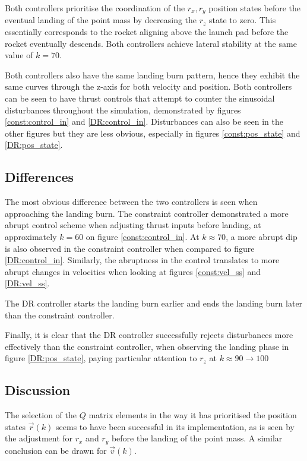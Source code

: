 \documentclass[conference, tikz]{IEEEtran}
\begin{document}
Both controllers prioritise the coordination of the $r_x, r_y$ position states before the eventual landing of the point mass by decreasing the $r_z$ state to zero. This essentially corresponds to the rocket aligning above the launch pad before the rocket eventually descends. Both controllers achieve lateral stability at the same value of $k=70$. 

Both controllers also have the same landing burn pattern, hence they exhibit the same curves through the z-axis for both velocity and position. 
Both controllers can be seen to have thrust controls that attempt to counter the sinusoidal disturbances throughout the simulation, demonstrated by figures \ref{const:control_in} and \ref{DR:control_in}. Disturbances can also be seen in the other figures but they are less obvious, especially in figures \ref{const:pos_state} and \ref{DR:pos_state}. 

\subsection{Differences}
The most obvious difference between the two controllers is seen when approaching the landing burn.
The constraint controller demonstrated a more abrupt control scheme when adjusting thrust inputs before landing, at approximately $k = 60$ on figure \ref{const:control_in}. At $k\approx70$, a more abrupt dip is also observed in the constraint controller when compared to figure \ref{DR:control_in}. Similarly, the abruptness in the control translates to more abrupt changes in velocities when looking at figures \ref{const:vel_ss} and \ref{DR:vel_ss}. 

The DR controller starts the landing burn earlier and ends the landing burn later than the constraint controller.

Finally, it is clear that the DR controller successfully rejects disturbances more effectively than the constraint controller, when observing the landing phase in figure \ref{DR:pos_state}, paying particular attention to $r_z$ at $k\approx 90 \rightarrow 100$

\subsection{Discussion}
The selection of the $Q$ matrix elements in the way it has prioritised the position states $\vec r(k)$ seems to have been successful in its implementation, as is seen by the adjustment for $r_x$ and $r_y$ before the landing of the point mass. A similar conclusion can be drawn for $\vec v(k)$. 
\end{document}
